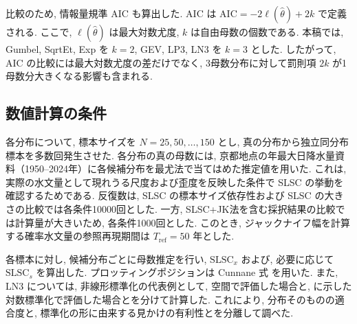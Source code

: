 比較のため, 情報量規準 AIC も算出した. AIC は $\mathrm{AIC}=-2\ell(\hat{\theta})+2k$ で定義される. ここで, $\ell(\hat{\theta})$ は最大対数尤度, $k$ は自由母数の個数である. 本稿では, Gumbel, SqrtEt, Exp を $k=2$, GEV, LP3, LN3 を $k=3$ とした.
したがって, AIC の比較には最大対数尤度の差だけでなく, 3母数分布に対して罰則項 $2k$ が1母数分大きくなる影響も含まれる.

\subsection{数値計算の条件}
各分布について, 標本サイズを $N=25,50,\ldots,150$ とし, 真の分布から独立同分布標本を多数回発生させた.
各分布の真の母数には, 京都地点の年最大日降水量資料（1950--2024年）に各候補分布を最尤法で当てはめた推定値を用いた.
これは, 実際の水文量として現れうる尺度および歪度を反映した条件で SLSC の挙動を確認するためである.
反復数は, SLSC の標本サイズ依存性および SLSC の大きさの比較では各条件10000回とした.
一方, SLSC+JK法を含む採択結果の比較では計算量が大きいため, 各条件1000回とした.
このとき, ジャックナイフ幅を計算する確率水文量の参照再現期間は \(T_{\mathrm{ref}}=50\) 年とした.

各標本に対し, 候補分布ごとに母数推定を行い, \(\mathrm{SLSC}_x\) および, 必要に応じて \(\mathrm{SLSC}_s\) を算出した.
プロッティングポジションは Cunnane 式
を用いた.
また, LN3 については, 非線形標準化の代表例として, \Xsp 空間で評価した場合と,  に示した対数標準化で評価した場合とを分けて計算した.
これにより, 分布そのものの適合度と, 標準化の形に由来する見かけの有利性とを分離して調べた.
